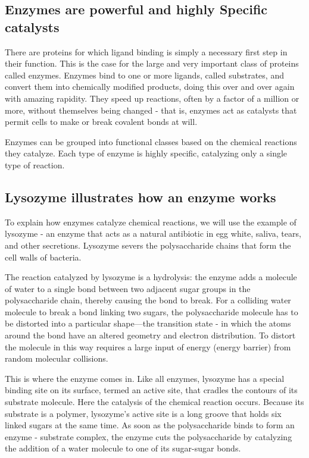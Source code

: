 \subsection{Enzymes are powerful and highly Specific catalysts}

There are proteins for which ligand binding is simply a necessary first step
in their function. This is the case for the large and very important class
of proteins called enzymes. Enzymes bind to one or more ligands, called substrates,
and convert them into chemically modified products, doing this over and over again with amazing rapidity.
They speed up reactions, often by a factor of a
million or more, without themselves being changed - that is, enzymes act
as catalysts that permit cells to make or break covalent bonds at will.

Enzymes can be grouped into functional classes based on the chemical
reactions they catalyze. Each type of enzyme is highly specific,
catalyzing only a single type of reaction.

\subsection{Lysozyme illustrates how an enzyme works}

To explain how enzymes catalyze chemical reactions, we will use the
example of lysozyme - an enzyme that acts as a natural antibiotic in egg
white, saliva, tears, and other secretions. Lysozyme severs the polysaccharide
chains that form the cell walls of bacteria.

The reaction catalyzed by lysozyme is a hydrolysis: the enzyme adds a
molecule of water to a single bond between two adjacent sugar groups in
the polysaccharide chain, thereby causing the bond to break.
For a colliding water molecule to break a bond linking two sugars, the
polysaccharide molecule has to be distorted into a particular shape—the
transition state - in which the atoms around the bond have an altered
geometry and electron distribution. To distort the molecule in this way
requires a large input of energy (energy barrier) from random molecular collisions.

This is where the enzyme comes in. Like all enzymes, lysozyme has a
special binding site on its surface, termed an active site, that cradles the
contours of its substrate molecule. Here the catalysis of the chemical reaction
occurs. Because its substrate is a polymer, lysozyme’s active site is a
long groove that holds six linked sugars at the same time. As soon as the
polysaccharide binds to form an enzyme - substrate complex, the enzyme
cuts the polysaccharide by catalyzing the addition of a water molecule to
one of its sugar-sugar bonds.

